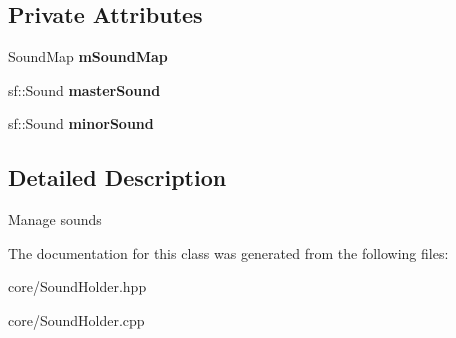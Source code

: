 \subsection*{\-Private \-Attributes}
\begin{DoxyCompactItemize}
\item 
\hypertarget{classSoundHolder_a58d076b62daad66a7d87184633852df9_a58d076b62daad66a7d87184633852df9}{\-Sound\-Map {\bfseries m\-Sound\-Map}}\label{classSoundHolder_a58d076b62daad66a7d87184633852df9_a58d076b62daad66a7d87184633852df9}

\item 
\hypertarget{classSoundHolder_a9d5f729ab7caf20e5ef1ee702e5341b0_a9d5f729ab7caf20e5ef1ee702e5341b0}{sf\-::\-Sound {\bfseries master\-Sound}}\label{classSoundHolder_a9d5f729ab7caf20e5ef1ee702e5341b0_a9d5f729ab7caf20e5ef1ee702e5341b0}

\item 
\hypertarget{classSoundHolder_a3a8a2f533213a77209b01e1c21f3f804_a3a8a2f533213a77209b01e1c21f3f804}{sf\-::\-Sound {\bfseries minor\-Sound}}\label{classSoundHolder_a3a8a2f533213a77209b01e1c21f3f804_a3a8a2f533213a77209b01e1c21f3f804}

\end{DoxyCompactItemize}


\subsection{\-Detailed \-Description}
\-Manage sounds 

\-The documentation for this class was generated from the following files\-:\begin{DoxyCompactItemize}
\item 
core/\-Sound\-Holder.\-hpp\item 
core/\-Sound\-Holder.\-cpp\end{DoxyCompactItemize}
